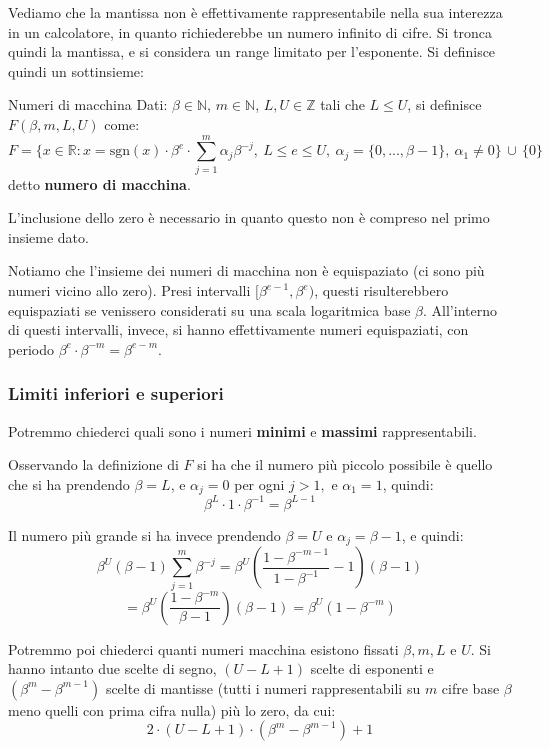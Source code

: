 \documentclass[a4paper,11pt]{article}
\begin{document}
Vediamo che la mantissa non è effettivamente rappresentabile nella sua interezza in un calcolatore, in quanto richiederebbe un numero infinito di cifre. 
Si tronca quindi la mantissa, e si considera un range limitato per l'esponente.
Si definisce quindi un sottinsieme:
\begin{definition}{Numeri di macchina}
	Dati:
	$\beta \in \mathbb{N}$, $m \in \mathbb{N}$, $L, U \in \mathbb{Z}$ tali che $L \leq U$, si definisce $F(\beta, m, L, U)$ come:
			$$
			F =\{ x \in \mathbb{R} : x = \mathrm{sgn}(x) \cdot \beta^e \cdot \sum_{j=1}^m \alpha_j \beta^{-j}, \ L \leq e \leq U, \ \alpha_j = \{ 0, ..., \beta - 1 \}, \ \alpha_1 \neq 0 \} \, \cup \, \{0\}
			$$
			detto \textbf{numero di macchina}.
\end{definition}

L'inclusione dello zero è necessario in quanto questo non è compreso nel primo insieme dato.

Notiamo che l'insieme dei numeri di macchina non è equispaziato (ci sono più numeri vicino allo zero).
Presi intervalli $[\beta^{e - 1}, \beta^e)$, questi risulterebbero equispaziati se venissero considerati su una scala logaritmica base $\beta$.
All'interno di questi intervalli, invece, si hanno effettivamente numeri equispaziati, con periodo $\beta^e \cdot \beta^{-m} = \beta^{e - m}$.

\subsubsection{Limiti inferiori e superiori}

Potremmo chiederci quali sono i numeri \textbf{minimi} e \textbf{massimi} rappresentabili.

Osservando la definizione di $F$ si ha che il numero più piccolo possibile è quello che si ha prendendo $\beta =L$, e $\alpha_j = 0$ per ogni $j > 1,$ e $\alpha_1 =1$, quindi:
$$
\beta^L \cdot 1 \cdot \beta^{-1} = \beta^{L - 1}
$$

Il numero più grande si ha invece prendendo $\beta = U$ e $\alpha_j = \beta - 1$, e quindi:
$$
\beta^U (\beta - 1) \sum_{j=1}^m \beta^{-j} = \beta^U \left( \frac{1-\beta^{-m-1}}{1-\beta^{-1}} - 1\right) (\beta - 1)
$$
$$
= \beta^U \left( \frac{1-\beta^{-m}}{\beta - 1} \right) (\beta - 1) = \beta^U (1 - \beta^{-m}) 
$$

Potremmo poi chiederci quanti numeri macchina esistono fissati $\beta, m, L$ e $U$. 
Si hanno intanto due scelte di segno, $(U - L  + 1)$ scelte di esponenti e $(\beta^m - \beta^{m - 1})$ scelte di mantisse (tutti i numeri rappresentabili su $m$ cifre base $\beta$ meno quelli con prima cifra nulla) più lo zero, da cui:
$$
2 \cdot (U - L  + 1) \cdot (\beta^m - \beta^{m - 1}) + 1
$$
\end{document}
